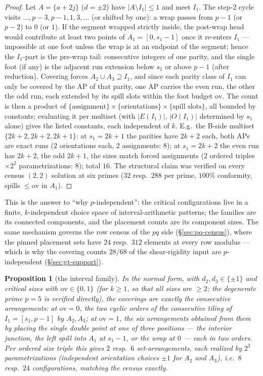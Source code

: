 \documentclass[11pt,a4paper]{article}
\numberwithin{equation}{section}
\theoremstyle{plain}
\newtheorem{proposition}[theorem]{Proposition}
\theoremstyle{definition}
\theoremstyle{remark}
\begin{document}
\begin{proof}
Let $A=\{a+2j\}$ ($d=\pm2$) have $|A\setminus I_1|\le1$ and meet $I_1$.
The step-$2$ cycle visits $\dots,p{-}3,p{-}1,1,3,\dots$ (or shifted by
one): a wrap passes from $p-1$ (or $p-2$) to $0$ (or $1$). If the segment
wrapped strictly inside, the post-wrap head would contribute at least two
points of $A_1=[0,s_1-1]$ once it re-enters $I_1$ --- impossible at one
foot unless the wrap is at an endpoint of the segment; hence the $I_1$-part
is the pre-wrap tail: consecutive integers of one parity, and the single
foot (if any) is the adjacent run extension below $s_1$ or above $p-1$
(after reduction). Covering forces $A_2\cup A_3\supseteq I_1$, and since
each parity class of $I_1$ can only be covered by the AP of that parity,
one AP carries the even run, the other the odd run, each extended by its
spill slots within the foot budget $\mathrm{ov}$. The count is then a
product of $\{\text{assignment}\}\times\{\text{orientations}\}\times
\{\text{spill slots}\}$, all bounded by constants; evaluating it per
multiset (with $|E(I_1)|$, $|O(I_1)|$ determined by $s_1$ alone) gives the
listed constants, each independent of $k$. E.g.\ the B-side multiset
$\{2k{+}2,2k{+}2,2k{+}1\}$: at $s_1=2k{+}1$ the parities have $2k{+}2$
each, both APs are exact runs ($2$ orientations each, $2$ assignments:
$8$); at $s_1=2k{+}2$ the even run has $2k{+}2$, the odd $2k{+}1$, the
sizes match forced assignments ($2$ ordered triples $\times2^2$
parametrizations: $8$); total $16$. The structural claim was verified on
every census $(2,2)$ solution at six primes ($32$ resp.\ $288$ per prime,
$100\%$ conformity, spills $\le\mathrm{ov}$ in $A_1$).
\end{proof}

This is the answer to ``why $p$-independent'': the critical configurations
live in a finite, $k$-independent choice space of interval-arithmetic
patterns; the families are its connected components, and the placement
counts are its component sizes. The same mechanism governs the row census
of the $pq$ side (\S\ref{sec:pq-census}), where the pinned placement sets
have $24$ resp.\ $312$ elements at every row modulus --- which is why the
covering counts $28/68$ of the shear-rigidity input are $p$-independent
(\S\ref{sec:gt-support}).

\begin{proposition}[the interval family]\label{prop:F1}
In the normal form, with $d_2,d_3\in\{\pm1\}$ and critical sizes with
$\mathrm{ov}\in\{0,1\}$ (for $k\ge1$, so that all sizes are $\ge2$; the
degenerate prime $p=5$ is verified directly), the coverings are exactly the consecutive
arrangements: at $\mathrm{ov}=0$, the two cyclic orders of the consecutive
tiling of $I_1=[s_1,p-1]$ by $A_2,A_3$; at $\mathrm{ov}=1$, the six
arrangements obtained from them by placing the single double point at one of
three positions --- the interior junction, the left spill into $A_1$ at
$s_1-1$, or the wrap at $0$ --- each in two orders. Per ordered size triple
this gives $2$ resp.\ $6$ set-arrangements, each realized by $2^2$
parametrizations (independent orientation choices $\pm1$ for $A_2$ and
$A_3$), i.e.\ $8$ resp.\ $24$ configurations, matching the census exactly.
\end{proposition}
\end{document}
